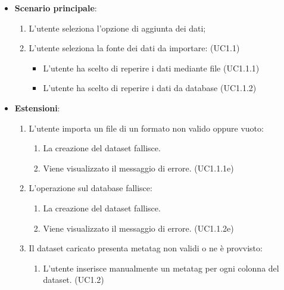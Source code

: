 \begin{itemize}
	\item \textbf{Scenario principale}:
		\begin{enumerate}
			\item L'utente seleziona l'opzione di aggiunta dei dati;
            \item L'utente seleziona la fonte dei dati da importare: (UC1.1)
            \begin{itemize}
                \item L'utente ha scelto di reperire i dati mediante file (UC1.1.1)
                \item L'utente ha scelto di reperire i dati da database (UC1.1.2)
            \end{itemize}
        \end{enumerate}
    \item \textbf{Estensioni}:
        \begin{enumerate}
            \item L'utente importa un file di un formato non valido oppure vuoto:
            \begin{enumerate}
                \item La creazione del dataset fallisce.
                \item Viene visualizzato il messaggio di errore. (UC1.1.1e)
            \end{enumerate}
            \item L'operazione sul database fallisce:
            \begin{enumerate}
                \item La creazione del dataset fallisce.
                \item Viene visualizzato il messaggio di errore. (UC1.1.2e)
            \end{enumerate}
            \item Il dataset caricato presenta metatag non validi o ne è provvisto:
            \begin{enumerate}
                \item L'utente inserisce manualmente un metatag per ogni colonna del dataset. (UC1.2)
            \end{enumerate}
        \end{enumerate}
\end{itemize}


